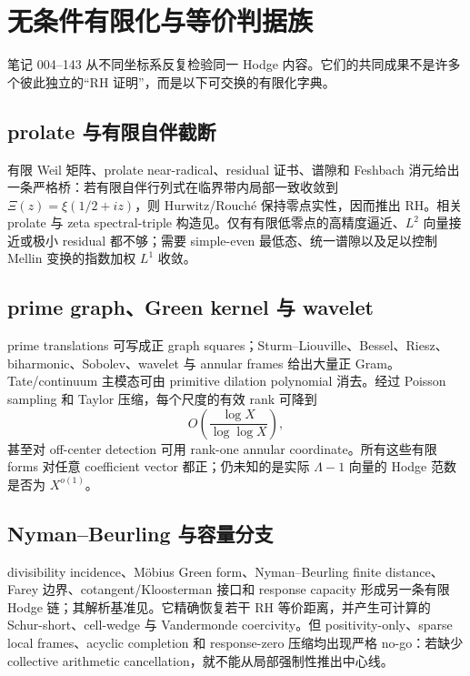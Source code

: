 \documentclass[UTF8,11pt,a4paper]{ctexart}
\theoremstyle{definition}
\theoremstyle{remark}
\newcommand{\1}{\mathbf 1}
\begin{document}
\section{无条件有限化与等价判据族}

笔记 004--143 从不同坐标系反复检验同一 Hodge 内容。它们的共同成果不是许多个彼此独立的“RH 证明”，而是以下可交换的有限化字典。

\subsection{prolate 与有限自伴截断}

有限 Weil 矩阵、prolate near-radical、residual 证书、谱隙和 Feshbach 消元给出一条严格桥：若有限自伴行列式在临界带内局部一致收敛到 $\Xi(z)=\xi(1/2+iz)$，则 Hurwitz/Rouch\'e 保持零点实性，因而推出 RH。相关 prolate 与 zeta spectral-triple 构造见\cite{CC2021,CCMProlate,CCM2025}。仅有有限低零点的高精度逼近、$L^2$ 向量接近或极小 residual 都不够；需要 simple-even 最低态、统一谱隙以及足以控制 Mellin 变换的指数加权 $L^1$ 收敛。

\subsection{prime graph、Green kernel 与 wavelet}

prime translations 可写成正 graph squares；Sturm--Liouville、Bessel、Riesz、biharmonic、Sobolev、wavelet 与 annular frames 给出大量正 Gram。Tate/continuum 主模态可由 primitive dilation polynomial 消去。经过 Poisson sampling 和 Taylor 压缩，每个尺度的有效 rank 可降到
\[
  O\!\left(\frac{\log X}{\log\log X}\right),
\]
甚至对 off-center detection 可用 rank-one annular coordinate。所有这些有限 forms 对任意 coefficient vector 都正；仍未知的是实际 $\Lambda-1$ 向量的 Hodge 范数是否为 $X^{o(1)}$。

\subsection{Nyman--Beurling 与容量分支}

divisibility incidence、M\"obius Green form、Nyman--Beurling finite distance、Farey 边界、cotangent/Kloosterman 接口和 response capacity 形成另一条有限 Hodge 链；其解析基准见\cite{NymanBeurling,BaezDuarte,Burnol}。它精确恢复若干 RH 等价距离，并产生可计算的 Schur-short、cell-wedge 与 Vandermonde coercivity。但 positivity-only、sparse local frames、acyclic completion 和 response-zero 压缩均出现严格 no-go：若缺少 collective arithmetic cancellation，就不能从局部强制性推出中心线。
\end{document}
